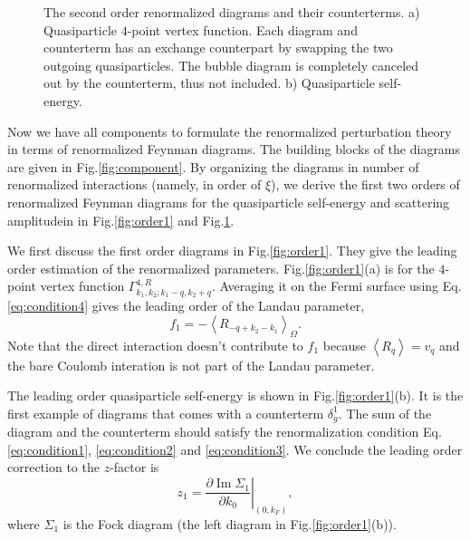 \documentclass[reprint,amsmath,amssymb,aps,prb]{revtex4-1}
\begin{document}
\begin{figure}
    \centering
    \begin{subfigure}{\linewidth}
        \resizebox{0.75\linewidth}{!}{
            
        }
        \caption{}
    \end{subfigure}
    \begin{subfigure}{\linewidth}
        \resizebox{0.75\linewidth}{!}{
            
        }
        \caption{ }
    \end{subfigure}
    \caption{The second order renormalized diagrams and their counterterms.
        a) Quasiparticle $4$-point vertex function. Each diagram and counterterm has an
        exchange counterpart by swapping the two outgoing quasiparticles. The bubble diagram is completely
        canceled out by the counterterm, thus not included.
        b) Quasiparticle self-energy.}
    \label{fig:order2}
\end{figure}


Now we have all components to formulate the renormalized perturbation theory in terms of renormalized Feynman diagrams.
The building blocks of the diagrams are given in Fig.\eqref{fig:component}. By organizing the
diagrams in number of renormalized interactions (namely, in order of $\xi$),
we derive the first two orders of renormalized Feynman diagrams for the quasiparticle
self-energy and scattering amplitudein in Fig.\ref{fig:order1} and Fig.\ref{fig:order2}.

We first discuss the first order diagrams in Fig.\ref{fig:order1}. They give the leading order
estimation of the renormalized parameters. Fig.\ref{fig:order1}(a) is for the $4$-point vertex function
$\Gamma^{4,R}_{k_1, k_2; k_1-q, k_2+q}$. Averaging it on the Fermi surface using Eq.\eqref{eq:condition4}
gives the leading order of the Landau parameter,
\begin{equation}
    f_1 = -\left< R_{-q+k_2-k_1}\right>_\Omega.
\end{equation}
Note that the direct interaction doesn't contribute to $f_1$ because
$\left<R_q\right>=v_q$ and the bare Coulomb interation is not part of the Landau parameter.

The leading order quasiparticle self-energy is shown in Fig.\eqref{fig:order1}(b).
It is the first example of diagrams that comes with a counterterm $\delta_g^1$. The sum of the diagram
and the counterterm should satisfy the renormalization condition Eq.\eqref{eq:condition1}, \eqref{eq:condition2} and \eqref{eq:condition3}.
We conclude the leading order correction to the $z$-factor is
\begin{equation}
    z_1 = \left. \frac{\partial \operatorname{Im} \Sigma_1}{\partial k_0} \right|_{(0, k_F)},
\end{equation}
where $\Sigma_1$ is the Fock diagram (the left diagram in Fig.\eqref{fig:order1}(b)).
\end{document}
